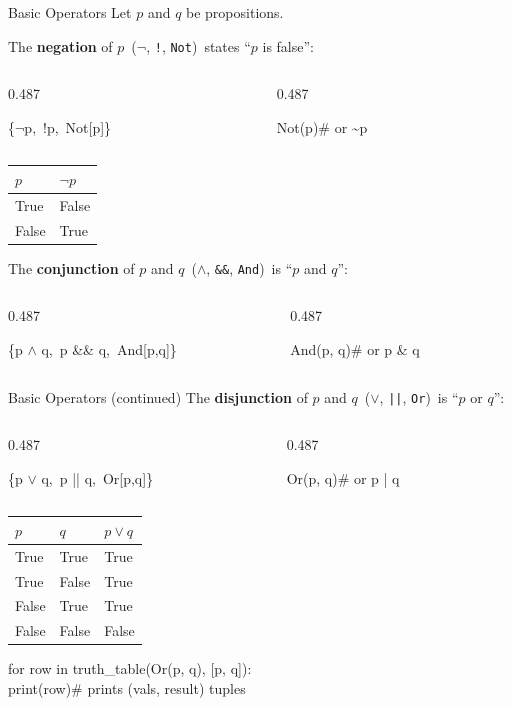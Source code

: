 \documentclass[aspectratio=169]{beamer}
\newcommand{\wcode}[1]{\texttt{\textcolor{wfg}{#1}}}
\newcommand{\dualcols}[2]{%
  \begin{columns}[T,onlytextwidth]
    \begin{column}{0.487\textwidth}
      \begin{tcolorbox}[wfstyle]#1\end{tcolorbox}
    \end{column}
    \begin{column}{0.487\textwidth}
      \begin{tcolorbox}[spstyle]#2\end{tcolorbox}
    \end{column}
  \end{columns}
}
\begin{document}
\begin{frame}[t]{Basic Operators}
  Let $p$ and $q$ be propositions.
  \smallskip

  The \textbf{negation} of $p$
  \,($\neg$, \wcode{!}, \wcode{Not})\,
  states ``$p$ is false'':
  \vspace{2pt}
  \dualcols{%
    \{$\neg$p,\ !p,\ Not[p]\}
  }{%
    Not(p)\quad\# or \textasciitilde{}p
  }

  \begin{center}
    \renewcommand{\arraystretch}{1.2}
    \begin{tabular}{|>{\centering}p{1.5cm}|>{\centering\arraybackslash}p{1.5cm}|}
      \hline $p$ & $\neg p$\\\hline
      \rowcolor{rowred}  True  & False\\
      \rowcolor{rowblue} False & True\\\hline
    \end{tabular}
  \end{center}
  \vspace{2pt}

  The \textbf{conjunction} of $p$ and $q$
  \,($\wedge$, \wcode{\&\&}, \wcode{And})\,
  is ``$p$ and $q$'':
  \vspace{2pt}
  \dualcols{%
    \{p $\wedge$ q,\ p \&\& q,\ And[p,q]\}
  }{%
    And(p, q)\quad\# or p \& q
  }
\end{frame}

\begin{frame}[t]{Basic Operators (continued)}
  The \textbf{disjunction} of $p$ and $q$
  \,($\vee$, \wcode{||}, \wcode{Or})\,
  is ``$p$ or $q$'':
  \vspace{4pt}
  \dualcols{%
    \{p $\vee$ q,\ p || q,\ Or[p,q]\}
  }{%
    Or(p, q)\quad\# or p | q
  }

  \vspace{0.5em}
  \begin{center}
    \renewcommand{\arraystretch}{1.25}
    \begin{tabular}{|>{\centering}p{1.5cm}|>{\centering}p{1.5cm}|>{\centering\arraybackslash}p{1.8cm}|}
      \hline $p$ & $q$ & $p \vee q$\\\hline
      \rowcolor{rowred}  True  & True  & True\\
      \rowcolor{rowred}  True  & False & True\\
      \rowcolor{rowred}  False & True  & True\\
      \rowcolor{rowblue} False & False & False\\\hline
    \end{tabular}
  \end{center}

  \vspace{0.5em}
  \begin{tcolorbox}[spstyle, title=SymPy --- truth table]
    for row in truth\_table(Or(p, q), [p, q]):\\
    \quad\quad print(row)\quad\# prints (vals, result) tuples
  \end{tcolorbox}
\end{frame}
\end{document}
